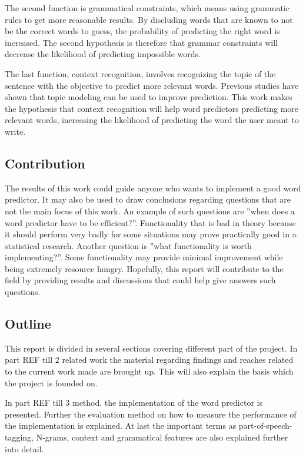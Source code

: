 The second function is grammatical constraints, which means using grammatic rules to get more reasonable results. By discluding words that are known to not be the correct words to guess, the probability of predicting the right word is increased. The second hypothesis is therefore that grammar constraints will decrease the likelihood of predicting impossible words.

The last function, context recognition, involves recognizing the topic of the sentence with the objective to predict more relevant words. Previous studies have shown that topic modeling can be used to improve prediction\cite{DBLP:journals/corr/cs-CL-0009027}\cite{keystrokes}. This work makes the hypothesis that context recognition will help word predictors predicting more relevant words, increasing the likelihood of predicting the word the user meant to write.

\subsection{Contribution}
The results of this work could guide anyone who wants to implement a good word predictor. It may also be used to draw conclusions regarding questions that are not the main focus of this work. An example of such questions are ''when does a word predictor have to be efficient?''. Functionality that is bad in theory because it should perform very badly for some situations may prove practically good in a statistical research. Another question is ''what functionality is worth implementing?''. Some functionality may provide minimal improvement while being extremely resource hungry. Hopefully, this report will contribute to the field by providing results and discussions that could help give answers such questions.

\subsection{Outline}

This report is divided in several sections covering different part of the project. 
In part {REF till 2 related work} the material regarding findings and reaches  related to the current work made are brought up. This will also explain the basis which the project is founded on.   

In part {REF till 3 method}, the implementation of the word predictor is presented. Further the evaluation method  on how to measure the performance  of the implementation is explained. At last the important terms as part-of-speech-tagging, N-grams, context and grammatical features are also explained further into detail. 

